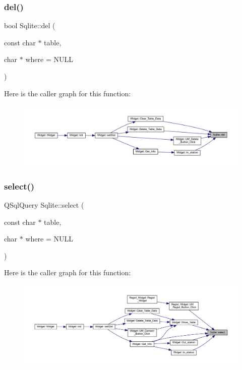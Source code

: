 \subsubsection{\texorpdfstring{del()}{del()}}
{\footnotesize\ttfamily bool Sqlite\+::del (\begin{DoxyParamCaption}\item[{const char $\ast$}]{table,  }\item[{char $\ast$}]{where = {\ttfamily NULL} }\end{DoxyParamCaption})}

Here is the caller graph for this function\+:
\nopagebreak
\begin{figure}[H]
\begin{center}
\leavevmode
\includegraphics[width=350pt]{class_sqlite_a30cc57d4645d2e63b3b3ee07f6ab1c94_icgraph}
\end{center}
\end{figure}
\mbox{\label{class_sqlite_ae5ba200378ca9bddfe57e2f8421ce949}} 
\subsubsection{\texorpdfstring{select()}{select()}}
{\footnotesize\ttfamily Q\+Sql\+Query Sqlite\+::select (\begin{DoxyParamCaption}\item[{const char $\ast$}]{table,  }\item[{char $\ast$}]{where = {\ttfamily NULL} }\end{DoxyParamCaption})}

Here is the caller graph for this function\+:
\nopagebreak
\begin{figure}[H]
\begin{center}
\leavevmode
\includegraphics[width=350pt]{class_sqlite_ae5ba200378ca9bddfe57e2f8421ce949_icgraph}
\end{center}
\end{figure}
\mbox{\label{class_sqlite_a4120092c96b9000b83a299d60635f2a3}} 
